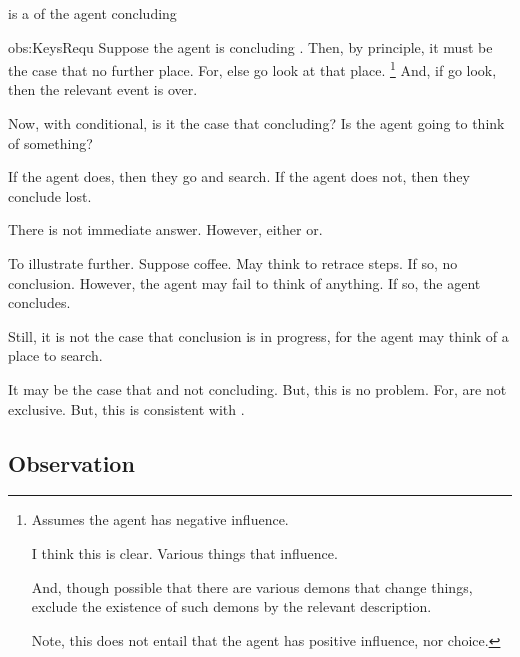 \begin{note}
  \begin{observation}%
    \label{obs:KeysRequ}%
     is a \requ{} of the agent concluding 
  \end{observation}


  \begin{motivation}{obs:KeysRequ}
    Suppose the agent is concluding .
    Then, by principle, it must be the case that no further place.
    For, else go look at that place.%
    \footnote{
      Assumes the agent has negative influence.

      I think this is clear.
      Various things that influence.

      And, though possible that there are various demons that change things, exclude the existence of such demons by the relevant description.

      Note, this does not entail that the agent has positive influence, nor choice.
    }
    And, if go look, then the relevant event is over.
  \end{motivation}

  Now, with conditional, is it the case that concluding?
  Is the agent going to think of something?

  If the agent does, then they go and search.
  If the agent does not, then they conclude lost.

  There is not immediate answer.
  However, either or.

  To illustrate further.
  Suppose coffee.
  May think to retrace steps.
  If so, no conclusion.
  However, the agent may fail to think of anything.
  If so, the agent concludes.

  Still, it is not the case that conclusion is in progress, for the agent may think of a place to search.

  It may be the case that \fc{} and not concluding.
  But, this is no problem.
  For,  are not exclusive.
  But, this is consistent with \requ{}.
\end{note}



\subsection{Observation}
\label{cha:requs:def:obs}

